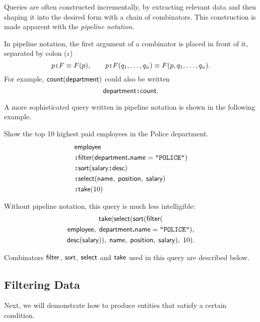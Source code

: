 Queries are often constructed incrementally, by extracting relevant data and
then shaping it into the desired form with a chain of combinators.  This
construction is made apparent with the \emph{pipeline notation}.

In pipeline notation, the first argument of a combinator is placed in front of
it, separated by colon ($\,\!\boldsymbol{:}\!\,$)
\begin{equation*}
    p \!\boldsymbol{:}\! F \equiv F(p), \qquad
    p \!\boldsymbol{:}\! F(q_1,\ldots,q_n) \equiv F(p,q_1,\ldots,q_n).
\end{equation*}
For example, $\textup{\textsf{count}}(\textup{\textsf{department}})$ could also be written
\begin{equation*}
    \textup{\textsf{department}}\!\boldsymbol{:}\!\textup{\textsf{count}}.
\end{equation*}

A more sophisticated query written in pipeline notation is shown in the
following example.

\begin{example}
    \label{ex:top-ten-highest-paid-policemen}
    Show the top 10 highest paid employees in the Police department.
    \begin{align*}
        & \Employee \\
        & \Apply\Filter(\Department\To\Name = \textup{\texttt{"POLICE"}}) \\
        & \Apply\Sort(\Salary\Apply\Desc) \\
        & \Apply\Select(\Name,\; \Position,\; \Salary) \\
        & \Apply\Take(10)
    \end{align*}
\end{example}

Without pipeline notation, this query is much less intelligible:
\begin{multline*}
    \textup{\textsf{take}}(\textup{\textsf{select}}(\textup{\textsf{sort}}(\textup{\textsf{filter}}( \\
    \textup{\textsf{employee}},\; \textup{\textsf{department}}\boldsymbol{.}\textup{\textsf{name}} = \texttt{"POLICE"}), \\
    \textup{\textsf{desc}}(\textup{\textsf{salary}})),\; \textup{\textsf{name}},\; \textup{\textsf{position}},\; \textup{\textsf{salary}}),\; 10).
\end{multline*}

Combinators $\textup{\textsf{filter}}$, $\textup{\textsf{sort}}$, $\textup{\textsf{select}}$ and $\textup{\textsf{take}}$ used in this query are
described below.

\subsection*{Filtering Data}

Next, we will demonstrate how to produce entities that satisfy a certain
condition.

